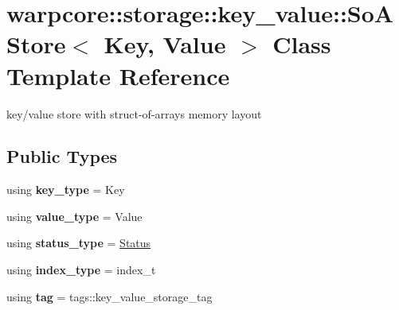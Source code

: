 \hypertarget{classwarpcore_1_1storage_1_1key__value_1_1SoAStore}{}\section{warpcore\+:\+:storage\+:\+:key\+\_\+value\+:\+:So\+A\+Store$<$ Key, Value $>$ Class Template Reference}
\label{classwarpcore_1_1storage_1_1key__value_1_1SoAStore}


key/value store with struct-\/of-\/arrays memory layout  


\subsection*{Public Types}
\begin{DoxyCompactItemize}
\item 
\mbox{\label{classwarpcore_1_1storage_1_1key__value_1_1SoAStore_aaf62f80f7231b706163763f0fd1e8e8e}} 
using {\bfseries key\+\_\+type} = Key
\item 
\mbox{\label{classwarpcore_1_1storage_1_1key__value_1_1SoAStore_aa7319b8f4847f18372fe9ce82f0e3173}} 
using {\bfseries value\+\_\+type} = Value
\item 
\mbox{\label{classwarpcore_1_1storage_1_1key__value_1_1SoAStore_a9896734c18911a23d8c3a7c4a1244fde}} 
using {\bfseries status\+\_\+type} = \hyperlink{classwarpcore_1_1Status}{Status}
\item 
\mbox{\label{classwarpcore_1_1storage_1_1key__value_1_1SoAStore_a218527a05fc4e0f11c96004726cedf7a}} 
using {\bfseries index\+\_\+type} = index\+\_\+t
\item 
\mbox{\label{classwarpcore_1_1storage_1_1key__value_1_1SoAStore_a0dd7578cfd17589dac56e17249ca0224}} 
using {\bfseries tag} = tags\+::key\+\_\+value\+\_\+storage\+\_\+tag
\end{DoxyCompactItemize}
